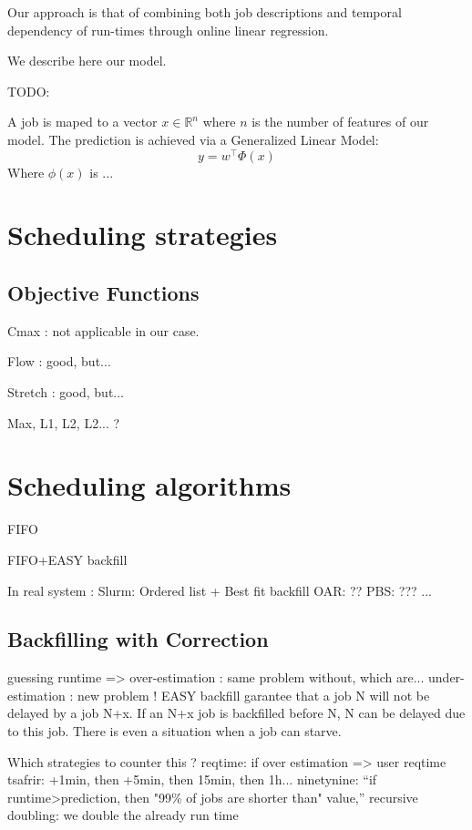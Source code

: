 \documentclass{llncs}
\begin{document}
Our approach is that of combining both job descriptions and temporal dependency of run-times through online linear regression.

We describe here our model.

TODO:

A job is maped to a vector $x \in \mathbb{R}^{n}$ where $n$ is the number of features of our model.
The prediction is achieved via a Generalized Linear Model:
\[
  y = w^{\intercal} \Phi(x)
\]
Where $\phi(x)$ is ...




\section{Scheduling strategies}
\label{sec:scheduling_strategies}


\subsection{Objective Functions}
\label{sub:objective_functions}

Cmax : not applicable in our case.

Flow : good, but...

Stretch : good, but...

Max, L1, L2, L2... ?

\section{Scheduling algorithms}
\label{sec:scheduling_algorithms}

FIFO

FIFO+EASY backfill

In real system :
Slurm: Ordered list + Best fit backfill
OAR: ??
PBS: ???
...




\subsection{Backfilling with Correction}
\label{sub:backfilling_with_correction}

guessing runtime =>
over-estimation : same problem without, which are...
under-estimation : new problem ! EASY backfill garantee that a job N will not be delayed by a job N+x.
If an N+x job is backfilled before N, N can be delayed due to this job. There is even a situation when a job can starve.

Which strategies to counter this ?
reqtime: if over estimation => user reqtime
tsafrir: +1min, then +5min, then 15min, then 1h...
ninetynine: ``if runtime>prediction, then "99\% of jobs are shorter than" value,''
recursive doubling: we double the already run time
\end{document}
